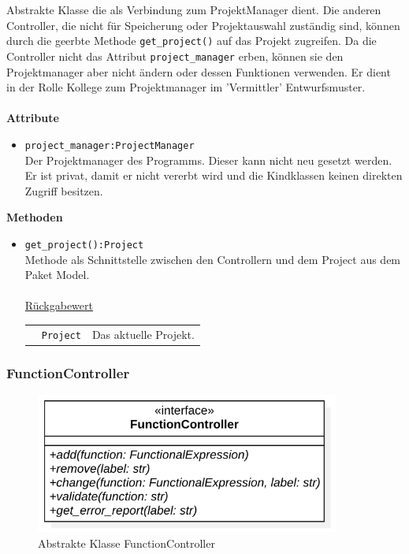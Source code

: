 \documentclass{article}
\begin{document}
Abstrakte Klasse die als Verbindung zum ProjektManager dient. Die anderen Controller, die nicht für Speicherung oder Projektauswahl zuständig sind, können durch die geerbte Methode \texttt{get\_project()} auf das Projekt zugreifen. Da die Controller nicht das Attribut \texttt{project\_manager} erben, können sie den Projektmanager aber nicht ändern oder dessen Funktionen verwenden. Er dient in der Rolle Kollege zum 
Projektmanager im 'Vermittler' Entwurfsmuster.
\\\\
\textbf{\large{Attribute}}
\begin{itemize}
\item \texttt{project\_manager:ProjectManager}\\ Der Projektmanager des Programms. Dieser kann nicht neu gesetzt werden. Er ist privat, damit er nicht vererbt wird und die Kindklassen keinen direkten Zugriff besitzen.
\end{itemize}\leavevmode\newline
\textbf{\large{Methoden}}
\begin{itemize}
\item \texttt{get\_project():Project}\\ Methode als Schnittstelle zwischen den Controllern und dem Project aus dem Paket Model.\\\\
\underline{{Rückgabewert}}\\
\begin{tabular}{lll}
 & \texttt{Project} & Das aktuelle Projekt. \\
\end{tabular}
\end{itemize}



\newpage
\subsubsection*{\large{\textbf{FunctionController}\label{cls:FunctionController}}}\normalsize

\begin{figure}[H]%
    \centering
    \includegraphics[width=10cm]{entwurf/Floriane/FunctionController.png}
    \caption{Abstrakte Klasse FunctionController}
\end{figure}
\end{document}
